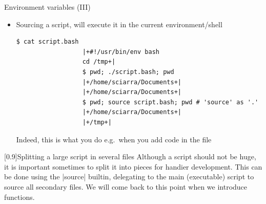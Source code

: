 \begin{frame}[fragile]{Environment variables (III)}
    \vspace{-1mm}
    \begin{itemize}
        \item Sourcing a script, will execute it in the current environment/shell
              \begin{lstlisting}[style=MyBash, numbers=none, aboveskip=2mm, belowskip=-6mm, xrightmargin=20mm]
                  $ cat script.bash
                  |+#!/usr/bin/env bash
                  cd /tmp+|
                  $ pwd; ./script.bash; pwd
                  |+/home/sciarra/Documents+|
                  |+/home/sciarra/Documents+|
                  $ pwd; source script.bash; pwd # 'source' as '.'
                  |+/home/sciarra/Documents+|
                  |+/tmp+|
              \end{lstlisting}
              Indeed, this is what you do e.g.\ when you add code in the  file
    \end{itemize}
    \begin{varblock}{}[0.9\textwidth]{Splitting a large script in several files}
        Although a script should not be huge, it is important sometimes to split it into pieces for handier development.
        This can be done using the \bash|source| builtin, delegating to the main (executable) script to source all secondary files.
        We will come back to this point when we introduce functions.
    \end{varblock}
\end{frame}
